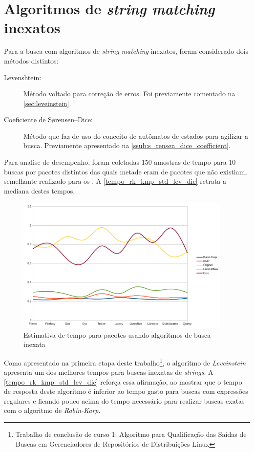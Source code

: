 \section{Algoritmos de \textit{string matching} inexatos} %
\label{sec:algor_timos_de_string_matching_inexatos}

Para a busca com algoritmos de \textit{string matching} inexatos, foram considerado dois métodos distintos:

\begin{description}
	\item[Levenshtein:] Método voltado para correção de erros. Foi previamente comentado na \autoref{sec:leveinstein}.
	\item[Coeficiente de Sørensen–Dice:] Método que faz de uso do conceito de autômatos de estados para agilizar a busca. Previamente apresentado na \autoref{ssub:s_rensen_dice_coefficient}.
\end{description}

Para analise de desempenho, foram coletadas 150 amostras de tempo para 10 buscas por pacotes distintos das quais metade eram de pacotes que não existiam, semelhante realizado para os . A \autoref{tempo_rk_kmp_std_lev_dic} retrata a mediana destes tempos.

\begin{figure}[htbp]
  \centering
  \includegraphics[width=0.95\textwidth]{figuras/tempo-rk_kmp_std_lev_dice}
  \caption{Estimativa de tempo para pacotes usando algoritmos de busca inexata}
  \label{tempo_rk_kmp_std_lev_dic}
\end{figure}

Como apresentado na primeira etapa deste trabalho\footnote{Trabalho de conclusão de curso 1: Algoritmo para Qualificação das Saídas de Buscas em
Gerenciadores de Repositórios de Distribuições Linux}, o algoritmo de \textit{Leveinstein} apresenta um dos melhores tempos para buscas inexatas de \textit{strings}. A \autoref{tempo_rk_kmp_std_lev_dic} reforça essa afirmação, ao mostrar que o tempo de resposta deste algoritmo é inferior ao tempo gasto para buscas com expressões regulares e ficando pouco acima do tempo necessário para realizar buscas exatas com o algoritmo de  \textit{Rabin-Karp}.